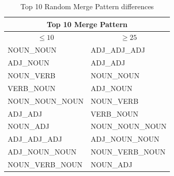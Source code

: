 \documentclass[12pt]{article}
\begin{document}
\begin{table}[!h]
\begin{center}
\fontsize{10pt}{10pt}\selectfont
\begin{tabular}{|ll|}
\hline
\multicolumn{2}{|c|}{Top 10 Merge Pattern}                      \\ \hline
\multicolumn{1}{|c|}{$\leq10$}            & \multicolumn{1}{c|}{$\geq25$} \\ \hline
\multicolumn{1}{|l|}{NOUN\_NOUN}      & ADJ\_ADJ\_ADJ              \\ \hline
\multicolumn{1}{|l|}{ADJ\_NOUN}       & ADJ\_ADJ                  \\ \hline
\multicolumn{1}{|l|}{NOUN\_VERB}      & NOUN\_NOUN                \\ \hline
\multicolumn{1}{|l|}{VERB\_NOUN}      & ADJ\_NOUN                 \\ \hline
\multicolumn{1}{|l|}{NOUN\_NOUN\_NOUN} & NOUN\_VERB                \\ \hline
\multicolumn{1}{|l|}{ADJ\_ADJ}        & VERB\_NOUN                \\ \hline
\multicolumn{1}{|l|}{NOUN\_ADJ}       & NOUN\_NOUN\_NOUN           \\ \hline
\multicolumn{1}{|l|}{ADJ\_ADJ\_ADJ}    & ADJ\_NOUN\_NOUN           \\ \hline
\multicolumn{1}{|l|}{ADJ\_NOUN\_NOUN}  & NOUN\_VERB\_NOUN           \\ \hline
\multicolumn{1}{|l|}{NOUN\_VERB\_NOUN} & NOUN\_ADJ                 \\ \hline
\end{tabular}
\caption{Top 10 Random Merge Pattern differences}
\label{appendix:top10RMergeDiff}
\end{center}
\end{table}
\end{document}
